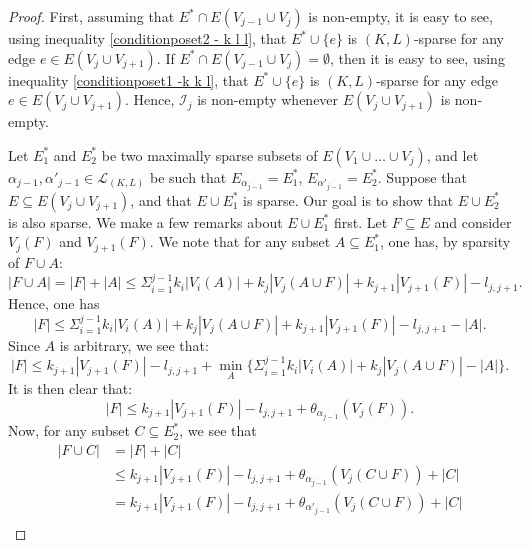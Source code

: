 \documentclass{article}
\begin{document}
\begin{proof}

First, assuming that $E^* \cap E(V_{j-1}\cup V_j)$ is non-empty, it is easy to see, using inequality \eqref{conditionposet2 - k l l}, that $E^* \cup \{e\}$ is $(K,L)$-sparse for any edge $e \in E(V_{j} \cup V_{j+1})$. If $E^* \cap E(V_{j-1}\cup V_j)= \emptyset$, then it is easy to see, using inequality \eqref{conditionposet1 -k k l}, that $E^* \cup \{e\}$ is $(K,L)$-sparse for any edge $e \in E(V_{j} \cup V_{j+1})$. Hence, $\mathcal{I}_j$ is non-empty whenever $E(V_{j} \cup V_{j+1})$ is non-empty.

Let $E_1^{*}$ and $E_{2}^{*}$ be two maximally sparse subsets of $E(V_1 \cup \dots \cup V_{j})$, and let $\alpha_{j-1},\alpha'_{j-1} \in \mathcal{L}_{(K,L)}$ be such that $E_{\alpha_{j-1}} = E_1^*$, $E_{\alpha'_{j-1}} = E_2^*$. Suppose that $E\subseteq E(V_{j} \cup V_{j+1})$, and that $E \cup E_1^{*}$ is sparse. Our goal is to show that $E \cup E_{2}^{*}$ is also sparse.
We make a few remarks about $E \cup E_1^{*}$ first. Let $F\subseteq E$ and consider $V_{j}(F)$ and $V_{j+1}(F)$. We note that for any subset $A \subseteq E_1^{*}$, one has, by sparsity of $F \cup A$:
\begin{equation*}
|F \cup A|=|F| +|A| \leq  \Sigma_{i=1}^{j-1}k_i |V_i(A)| + k_{j} |V_{j}(A\cup F)| +  k_{j+1} |V_{j+1}(F)| -l_{{j},{j+1}}.
\end{equation*}
Hence, one has
\begin{equation*}
|F| \leq  \Sigma_{i=1}^{j-1} k_i |V_i(A)| + k_{j} |V_{j}(A\cup F)| +  k_{j+1} |V_{j+1}(F)| -l_{{j},{j+1}} - |A|.
\end{equation*}
Since $A$ is arbitrary, we see that:
\begin{equation*}
|F| \leq   k_{j+1} |V_{j+1}(F)| -l_{j,{j+1}} + \min_{A} \{ \Sigma_{i=1}^{j-1}k_i |V_i(A)| + k_{j} |V_{j}(A\cup F)| -|A|\}.
\end{equation*}
It is then clear that: 
\begin{equation*}
|F| \leq   k_{j+1} |V_{j+1}(F)| -l_{j,{j+1}} + \theta_{\alpha_{j-1}}(V_{j}(F)).
\end{equation*}
Now, for any subset $C\subseteq E_2^{*}$, we see that
\begin{align*}
|F \cup C|&=|F| + |C| \\
&\leq  k_{j+1} |V_{j+1}(F)| -l_{j,{j+1}} + \theta_{\alpha_{j-1}}(V_{j}(C\cup F)) + |C|\\
&=   k_{j+1} |V_{j+1}(F)| -l_{j,{j+1}} + \theta_{\alpha'_{j-1}}(V_{j}(C\cup F)) + |C|\\

\end{align*}
\end{proof}
\end{document}
